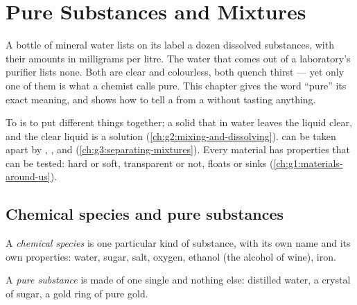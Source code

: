 \chapter{Pure Substances and Mixtures}\label{ch:g6:pure-substances-and-mixtures}

A bottle of mineral water lists on its label a dozen dissolved
substances, with their amounts in milligrams per litre. The water that
comes out of a laboratory's purifier lists none. Both are clear and
colourless, both quench thirst --- yet only one of them is what a
chemist calls pure. This chapter gives the word ``pure'' its exact
meaning, and shows how to tell a  from a  without
tasting anything.

\begin{recall}
To  is to put different things together; a solid that  in
water leaves the liquid clear, and the clear liquid is a solution
(\cref{ch:g2:mixing-and-dissolving}).  can be taken apart by
, ,  and 
(\cref{ch:g3:separating-mixtures}). Every material has properties that
can be tested: hard or soft, transparent or not, floats or sinks
(\cref{ch:g1:materials-around-us}).
\end{recall}

\section{Chemical species and pure substances}

\begin{definition}\label{def:g6:pure-substances-and-mixtures:species}
A \emph{chemical species} is one particular
kind of substance, with its own name and its own properties: water,
sugar, salt, oxygen, ethanol (the alcohol of wine), iron.
\end{definition}

\begin{definition}\label{def:g6:pure-substances-and-mixtures:pure-substance}
A \emph{pure substance} is made of one single
 and nothing else: distilled water, a crystal of sugar,
a gold ring of pure gold.
\end{definition}

